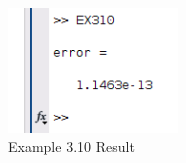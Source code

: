 \documentclass[11pt
  , a4paper
  , article
  , oneside
]{memoir}
\begin{document}
\begin{figure}[h!]
	\centering
	\includegraphics[width=0.4\textwidth,height=0.15\textwidth]{./images/Ex3-10.png}
	\caption{Example 3.10 Result}
	\label{fig:Example 3-10 Result}
\end{figure}
\end{document}
